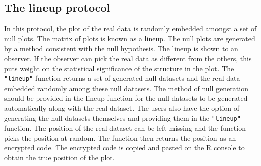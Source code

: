 \subsection{The lineup protocol}\label{the-lineup-protocol}

In this protocol, the plot of the real data is randomly embedded amongst
a set of null plots. The matrix of plots is known as a lineup. The null
plots are generated by a method consistent with the null hypothesis. The
lineup is shown to an observer. If the observer can pick the real data
as different from the others, this puts weight on the statistical
significance of the structure in the plot. The \texttt{"lineup"}
function returns a set of generated null datasets and the real data
embedded randomly among these null datasets. The method of null
generation should be provided in the lineup function for the null
datasets to be generated automatically along with the real dataset. The
users also have the option of generating the null datasets themselves
and providing them in the \texttt{"lineup"} function. The position of
the real dataset can be left missing and the function picks the position
at random. The function then returns the position as an encrypted code.
The encrypted code is copied and pasted on the R console to obtain the
true position of the plot.

